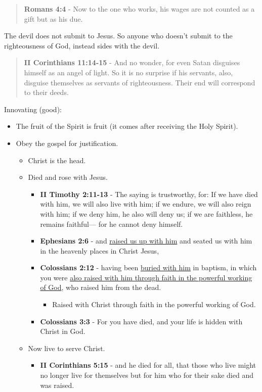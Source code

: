 \documentclass[11pt]{article}
\begin{document}
\begin{quote}
\textbf{Romans 4:4} - Now to the one who works, his wages are not counted as a gift but as his due.
\end{quote}

The devil does not submit to Jesus. So anyone who doesn't submit to the righteousness of God, instead sides with the devil.

\begin{quote}
\textbf{II Corinthians 11:14-15} - And no wonder, for even Satan disguises himself as an angel of light. So it is no surprise if his servants, also, disguise themselves as servants of righteousness. Their end will correspond to their deeds.
\end{quote}

Innovating (good):
\begin{itemize}
\item The fruit of the Spirit is fruit (it comes after receiving the Holy Spirit).
\item Obey the gospel for justification.
\begin{itemize}
\item Christ is the head.
\item Died and rose with Jesus.
\begin{itemize}
\item \textbf{II Timothy 2:11-13} - The saying is trustworthy, for: If we have died with him, we will also live with him; if we endure, we will also reign with him; if we deny him, he also will deny us; if we are faithless, he remains faithful— for he cannot deny himself.
\item \textbf{Ephesians 2:6} - and \uline{raised us up with him} and seated us with him in the heavenly places in Christ Jesus,
\item \textbf{Colossians 2:12} - having been \uline{buried with him} in baptism, in which you were \uline{also raised with him through faith in the powerful working of God}, who raised him from the dead.
\begin{itemize}
\item Raised with Christ through faith in the powerful working of God.
\end{itemize}
\item \textbf{Colossians 3:3} - For you have died, and your life is hidden with Christ in God.
\end{itemize}
\item Now live to serve Christ.
\begin{itemize}
\item \textbf{II Corinthians 5:15} - and he died for all, that those who live might no longer live for themselves but for him who for their sake died and was raised.

\end{itemize}
\end{itemize}
\end{itemize}
\end{document}
